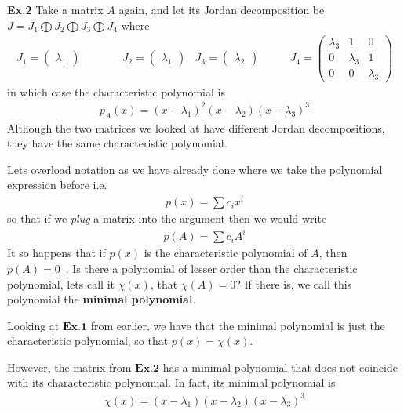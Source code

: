 \documentclass[a4paper,11pt]{exam}
\newcounter{ct}
\begin{document}
\begin{questions}
\begin{tcolorbox}[colback=black!1!,title=From Jordan form to characteristic polynomial]
    \textbf{Ex.2} Take a matrix $A$ again, and let its Jordan decomposition be $J =  J_1 \bigoplus J_2 \bigoplus J_3 \bigoplus J_4$ where
    \begin{align}
        J_1 = \begin{pmatrix} \lambda_1 \end{pmatrix} & \qquad\quad
        J_2 = \begin{pmatrix} \lambda_1 \end{pmatrix} &
        J_3 = \begin{pmatrix} \lambda_2 \end{pmatrix} &  \qquad
        J_4 = \begin{pmatrix} \lambda_3 & 1 & 0 \\ 0 & \lambda_3 & 1 \\ 0 & 0 & \lambda_3 \end{pmatrix}
    \end{align}
    in which case the characteristic polynomial is
    \begin{align}
        p_A(x) = (x - \lambda_1)^2 (x - \lambda_2) (x - \lambda_3)^3
    \end{align}
    Although the two matrices we looked at have different Jordan decompositions, they have the same characteristic polynomial. 
\end{tcolorbox}
Lets overload notation as we have already done where we take the polynomial expression before i.e.
\begin{align}
    p(x) = \sum c_i x^i
\end{align}
so that if we \textit{plug} a matrix into the argument then we would write
\begin{align}
    p(A) = \sum c_i A^i
\end{align}
It so happens that if $p(x)$ is the characteristic polynomial of $A$, then $p(A) = 0$~\cite{hirsch1974differential}.  Is there a polynomial of lesser order than the characteristic polynomial, lets call it $\chi(x)$, that $\chi(A) = 0$? If there is, we call this polynomial the \textbf{minimal polynomial}.  
\begin{tcolorbox}[colback=black!1!,title=Minimal polynomials]
    Looking at $\textbf{Ex.1}$ from earlier, we have that the minimal polynomial is just the characteristic polynomial, so that $p(x) = \chi(x)$.\newline

    However, the matrix from $\textbf{Ex.2}$ has a minimal polynomial that does not coincide with its characteristic polynomial.  In fact, its minimal polynomial is
    \begin{align}
        \chi(x) = (x - \lambda_1)(x - \lambda_2)(x - \lambda_3)^3
    \end{align}
\end{tcolorbox}


\end{questions}
\end{document}
